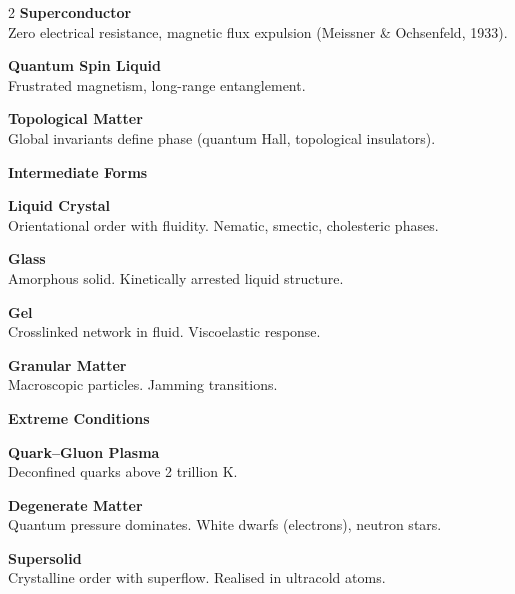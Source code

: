\begin{center}
\begin{tcolorbox}
\begin{multicols}{2}
\textbf{Superconductor}\\
{\footnotesize Zero electrical resistance, magnetic flux expulsion (Meissner \& Ochsenfeld, 1933).}\vspace{4pt}

\textbf{Quantum Spin Liquid}\\
{\footnotesize Frustrated magnetism, long-range entanglement.}\vspace{4pt}

\textbf{Topological Matter}\\
{\footnotesize Global invariants define phase (quantum Hall, topological insulators).}

\columnbreak

\colorbox{blue!15}{\textbf{ Intermediate Forms}}\vspace{2pt}

\textbf{Liquid Crystal}\\
{\footnotesize Orientational order with fluidity. Nematic, smectic, cholesteric phases.}\vspace{4pt}

\textbf{Glass}\\
{\footnotesize Amorphous solid. Kinetically arrested liquid structure.}\vspace{4pt}

\textbf{Gel}\\
{\footnotesize Crosslinked network in fluid. Viscoelastic response.}\vspace{4pt}

\textbf{Granular Matter}\\
{\footnotesize Macroscopic particles. Jamming transitions.}\vspace{8pt}

\colorbox{blue!15}{\textbf{ Extreme Conditions}}\vspace{2pt}

\textbf{Quark–Gluon Plasma}\\
{\footnotesize Deconfined quarks above 2 trillion K.}\vspace{4pt}

\textbf{Degenerate Matter}\\
{\footnotesize Quantum pressure dominates. White dwarfs (electrons), neutron stars.}\vspace{4pt}

\textbf{Supersolid}\\
{\footnotesize Crystalline order with superflow. Realised in ultracold atoms.}\vspace{4pt}


\end{multicols}
\end{tcolorbox}
\end{center}
